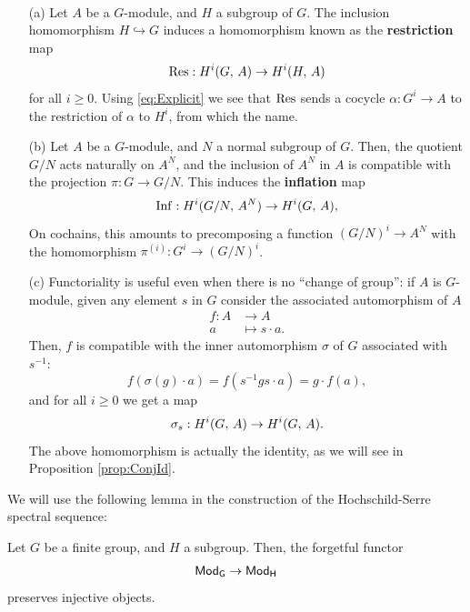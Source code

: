 \documentclass[a4paper, oneside]{memoir}
\begin{document}
\begin{definition}\label{def:InfRes}\
	\begin{itemize}
		\item[(a)]  Let $A$ be a $G$-module, and $H$ a subgroup of $G$. The inclusion homomorphism $H\hookrightarrow G$ induces a homomorphism known as the \textbf{restriction} map
		      \[
			      \operatorname{Res}: H^{i}( G, \, A )\to H^{i}( H, \, A )
		      \]
		      for all $i\geq 0$. Using \eqref{eq:Explicit} we see that $\operatorname{Res}$ sends a cocycle $\alpha: G^i\to A$ to the restriction of $\alpha$ to $H^i$, from which the name.
		\item[(b)] Let $A$ be a $G$-module, and $N$ a normal subgroup of $G$. Then, the quotient $G/N$ acts naturally on $A^N$, and the inclusion of $A^N$ in $A$ is compatible with the projection $\pi: G\to G/N$. This induces the \textbf{inflation} map
		      \[
			      \operatorname{Inf}: H^{i}( G/N, \, A^N )\to H^{i}( G, \, A ),
		      \]
		      On cochains, this amounts to precomposing a function $(G/N)^i\to A^N$ with the homomorphism $\pi^{(i)}: G^i\to (G/N)^i$.

		\item[(c)] Functoriality is useful even when there is no ``change of group'': if $A$ is $G$-module, given any element $s$ in $G$ consider the associated automorphism of $A$
		      \begin{align*}
			      f: A & \to A            \\
			      a    & \mapsto s\cdot a
			      .\end{align*}
		      Then, $f$ is compatible with the inner automorphism $\sigma$ of $G$ associated with $s^{-1}$:
		      \[
			      f(\sigma(g)\cdot a)=f(s^{-1}gs\cdot a)=g\cdot f(a),
		      \]
		      and for all $i\geq 0$ we get a map
		      \[
			      \sigma_s: H^{i}( G, \, A )\to H^{i}( G, \, A )
			      .\]
		      The above homomorphism is actually the identity, as we will see in Proposition \ref{prop:ConjId}.
	\end{itemize}
\end{definition}

\medskip We will use the following lemma in the construction of the Hochschild-Serre spectral sequence:

\begin{lemma}\label{lm:GHInj}
	Let $G$ be a finite group, and $H$ a subgroup. Then, the forgetful functor
	\[
		\mathsf{Mod}_\mathsf{G}\to\mathsf{Mod}_\mathsf{H}
	\]
	preserves injective objects.
\end{lemma}
\end{document}
